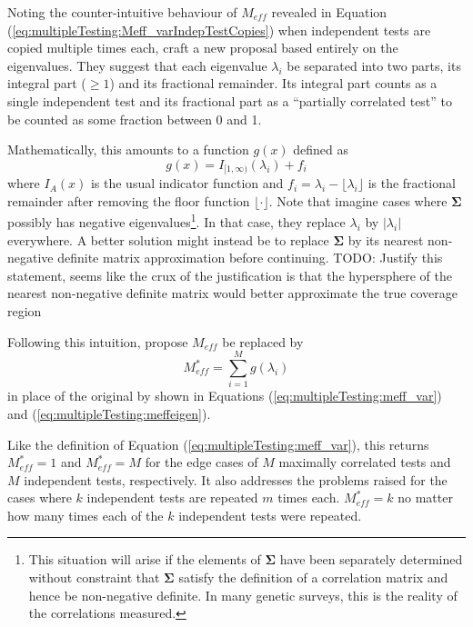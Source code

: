 \documentclass[letterpaper,12pt,oneside,final]{article}
\newcommand{\sm}[1]{\boldsymbol{#1}}   %
\newcommand{\abs}[1]{\lvert{#1}\rvert}              %
\newcommand{\TODO}[1]{{\color{brickred} TODO:  {#1}}}
\begin{document}
Noting the counter-intuitive behaviour of $M_{eff}$ revealed in Equation (\ref{eq:multipleTesting:Meff_varIndepTestCopies}) when independent tests are copied multiple times each, \cite{LiJi2005} craft a new proposal based entirely on the eigenvalues. They suggest that each eigenvalue $\lambda_i $ be separated into two parts, its integral part ($\ge 1$) and its fractional remainder. Its integral part counts as a single independent test and its fractional part as a ``partially correlated test'' to be counted as some fraction between 0 and 1.

Mathematically, this amounts to a function $g(x)$ 
defined as 
\begin{equation}
g(x) = I _{[1, \infty)} (\lambda_i) +  f_i
\end{equation}
where $I_A(x)$ is the usual indicator function and $f_i = \lambda_i - \lfloor \lambda_i \rfloor$ is the fractional remainder after removing the floor function $\lfloor \cdot \rfloor$.   Note that \cite{LiJi2005} imagine cases where $\sm{\Sigma}$ possibly has negative eigenvalues\footnote{This situation will arise if the elements of $\sm{\Sigma}$ have been separately determined without constraint that $\sm{\Sigma}$ satisfy the definition of a correlation matrix and hence be non-negative definite. In many genetic surveys, this is the reality of the correlations measured.}. In that case, they replace $\lambda_i$ by $\abs{\lambda_i}$ everywhere. A better solution might instead be to replace $\sm{\Sigma}$ by its nearest non-negative definite matrix approximation before continuing. \TODO{Justify this statement, seems like the crux of the justification is that the hypersphere of the nearest non-negative definite matrix would better approximate the true coverage region}

Following this intuition, \cite{LiJi2005}  propose  $M_{eff}$ be replaced by
\begin{equation}
 M_{eff}^*  = \sum_{i=1}^M g(\lambda_i) 
\label{eq:multipleTesting:meff_frac}
\end{equation}
in place of the original by \cite{cheverud2001} shown in Equations (\ref{eq:multipleTesting:meff_var}) and (\ref{eq:multipleTesting:meffeigen}).

Like the definition of Equation (\ref{eq:multipleTesting:meff_var}), this returns $M^*_{eff} = 1$  and $M_{eff}^* = M$ for the edge cases of $M$ maximally correlated tests and $M$ independent tests, respectively. It also addresses the problems raised for the cases where $k$ independent tests are repeated $m$ times each. $M_{eff}^* = k$ no matter how many times each of the $k$ independent tests were repeated.
\end{document}
